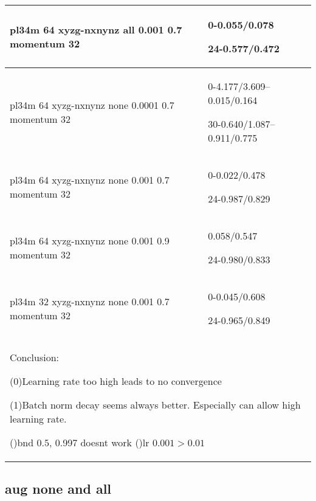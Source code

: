 \documentclass[,table,dvipsnames]{article}
\begin{document}
\begin{tabular}{|p{10cm}|p{5cm}| }
	pl34m 64 xyzg-nxnynz all 0.001 0.7 momentum 32 & 0-0.055/0.078\par 24-0.577/0.472\\	
	\hline
	
	pl34m 64 xyzg-nxnynz none 0.0001 0.7 momentum 32 & 0-4.177/3.609--0.015/0.164\par 30-0.640/1.087--0.911/0.775\\
	\hline 
	pl34m 64 xyzg-nxnynz none 0.001 0.7 momentum 32 & 0-0.022/0.478\par 24-0.987/0.829\\
	\hline
	pl34m 64 xyzg-nxnynz none 0.001 0.9 momentum 32 & 0.058/0.547\par 24-0.980/0.833\\
	\hline
	pl34m 32 xyzg-nxnynz none 0.001 0.7 momentum 32 & 0-0.045/0.608\par 24-0.965/0.849\\
	\hline
	
	\multicolumn{2}{|p{15cm}|}{ Conclusion:\par	
		(0)Learning rate too high leads to no convergence\par
		(1)Batch norm decay seems always better. Especially can allow high learning rate.\par
		()bnd $0.5$, 0.997 doesnt work
		()lr $0.001 > 0.01$  } \\
	\hline	
\end{tabular}

\subsection{aug none and all}
\end{document}
